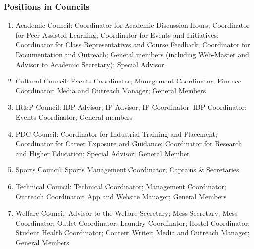 \documentclass[12pt]{article}
\begin{document}
\subsubsection{Positions in Councils}
\begin{enumerate}
    \item Academic Council: Coordinator for Academic Discussion Hours; Coordinator for Peer Assisted Learning; Coordinator for Events and Initiatives; Coordinator for Class Representatives and Course Feedback; Coordinator for Documentation and Outreach; General members (including Web-Master and Advisor to Academic Secretary); Special Advisor.
    \item Cultural Council: Events Coordinator; Management Coordinator; Finance Coordinator; Media and Outreach Manager; General Members
    \item IR\&P Council: IBP Advisor; IP Advisor; IP Coordinator; IBP Coordinator; Events Coordinator; General members
    \item PDC Council: Coordinator for Industrial Training and Placement; Coordinator for Career Exposure and Guidance; Coordinator for Research and Higher Education; Special Advisor; General Member
    \item Sports Council: Sports Management Coordinator; Captains \& Secretaries
    \item Technical Council: Technical Coordinator; Management Coordinator; Outreach Coordinator; App and Website Manager; General Members
    \item Welfare Council: Advisor to the Welfare Secretary; Mess Secretary; Mess Coordinator; Outlet Coordinator; Laundry Coordinator; Hostel Coordinator; Student Health Coordinator; Content Writer; Media and Outreach Manager; General Members
\end{enumerate}
\end{document}
